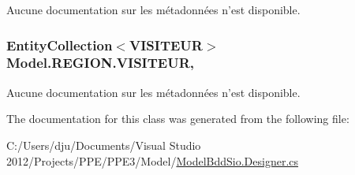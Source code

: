 Aucune documentation sur les métadonnées n'est disponible. 

\hypertarget{class_model_1_1_r_e_g_i_o_n_a41de25bdbbf292c65117c12cc2348bf8}{
\subsubsection[{V\-I\-S\-I\-T\-E\-U\-R}]{\setlength{\rightskip}{0pt plus 5cm}Entity\-Collection$<${\bf V\-I\-S\-I\-T\-E\-U\-R}$>$ Model.\-R\-E\-G\-I\-O\-N.\-V\-I\-S\-I\-T\-E\-U\-R\hspace{0.3cm}{\ttfamily [get]}, {\ttfamily [set]}}}\label{class_model_1_1_r_e_g_i_o_n_a41de25bdbbf292c65117c12cc2348bf8}


Aucune documentation sur les métadonnées n'est disponible. 



The documentation for this class was generated from the following file\-:\begin{DoxyCompactItemize}
\item 
C\-:/\-Users/dju/\-Documents/\-Visual Studio 2012/\-Projects/\-P\-P\-E/\-P\-P\-E3/\-Model/\hyperlink{_model_bdd_sio_8_designer_8cs}{Model\-Bdd\-Sio.\-Designer.\-cs}\end{DoxyCompactItemize}
